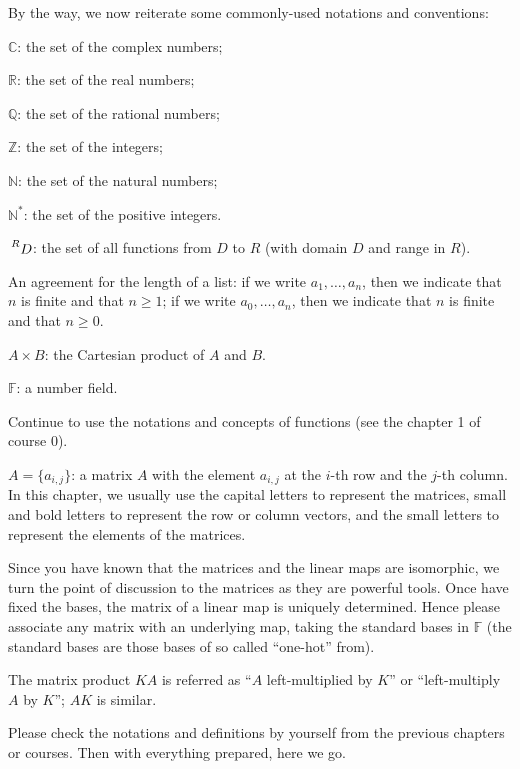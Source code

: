 \documentclass{article}
\begin{document}
By the way, we now reiterate some commonly-used notations and conventions:
\begin{compactenum}
    \item $\mathbb{C}$: the set of the complex numbers;
    \item $\mathbb{R}$: the set of the real numbers;
    \item $\mathbb{Q}$: the set of the rational numbers;
    \item $\mathbb{Z}$: the set of the integers;
    \item $\mathbb{N}$: the set of the natural numbers;
    \item $\mathbb{N^\ast}$: the set of the positive integers.
    \item $\sideset{^R}{}{\mathop{D}}$: the set of all functions from $D$ to $R$ (with domain $D$ and range in $R$).
    \item An agreement for the length of a list: if we write $a_1, \dots, a_n$, then we indicate that $n$ is finite and that $n\geq 1$; if we write $a_0, \dots, a_n$, then we indicate that $n$ is finite and that $n\geq 0$.
    \item $A\times B$: the Cartesian product of $A$ and $B$.
    \item $\mathbb{F}$: a number field.
    \item Continue to use the notations and concepts of functions (see the chapter 1 of course 0).
    \item $A = \{a_{i,j}\}$: a matrix $A$ with the element $a_{i,j}$ at the $i$-th row and the $j$-th column. In this chapter, we usually use the capital letters to represent the matrices, small and bold letters to represent the row or column vectors, and the small letters to represent the elements of the matrices.
    \item Since you have known that the matrices and the linear maps are isomorphic, we turn the point of discussion to the matrices as they are powerful tools. Once have fixed the bases, the matrix of a linear map is uniquely determined. Hence please associate any matrix with an underlying map, taking the standard bases in $\mathbb{F}$ (the standard bases are those bases of so called ``one-hot'' from).
    \item The matrix product $KA$ is referred as ``$A$ left-multiplied by $K$'' or ``left-multiply $A$ by $K$''; $AK$ is similar.
\end{compactenum} 
Please check the notations and definitions by yourself from the previous chapters or courses. Then with everything prepared, here we go.
\end{document}

